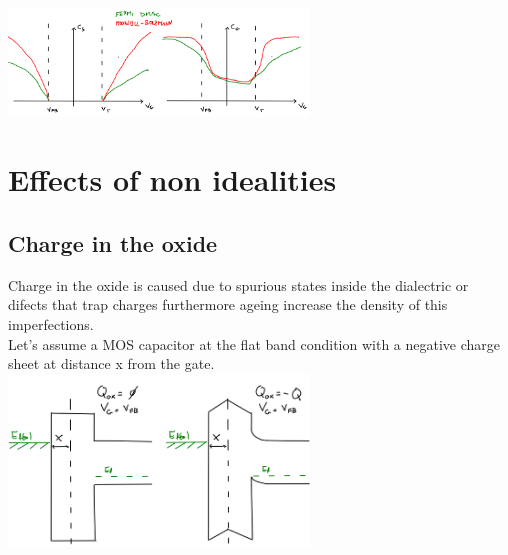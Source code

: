 \centering
\includegraphics[width=0.6\textwidth]{mbvsfdmos.png}\\
\raggedright


\section{Effects of non idealities}

\subsection{Charge in the oxide}

Charge in the oxide is caused due to spurious states inside the dialectric or difects that trap charges furthermore ageing increase the density of this imperfections.\\
Let's assume a MOS capacitor at the flat band condition with a negative charge sheet at distance x from the gate.\\ 

\centering
\includegraphics[width=0.6\textwidth]{qinox.png}\\
\raggedright

